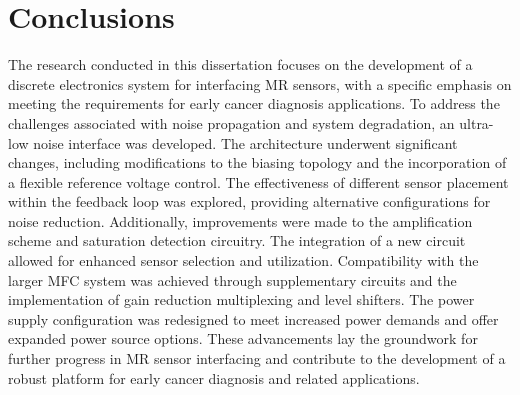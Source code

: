 \section{Conclusions}
\label{sec:concl}

The research conducted in this dissertation focuses on the development of a discrete electronics system for interfacing MR sensors, with a specific emphasis on meeting the requirements for early cancer diagnosis applications. To address the challenges associated with noise propagation and system degradation, an ultra-low noise interface was developed. The architecture underwent significant changes, including modifications to the biasing topology and the incorporation of a flexible reference voltage control. The effectiveness of different sensor placement within the feedback loop was explored, providing alternative configurations for noise reduction. Additionally, improvements were made to the amplification scheme and saturation detection circuitry. The integration of a new circuit allowed for enhanced sensor selection and utilization. Compatibility with the larger MFC system was achieved through supplementary circuits and the implementation of gain reduction multiplexing and level shifters. The power supply configuration was redesigned to meet increased power demands and offer expanded power source options. These advancements lay the groundwork for further progress in MR sensor interfacing and contribute to the development of a robust platform for early cancer diagnosis and related applications.